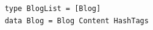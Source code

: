 \begin{lstlisting}
    type BlogList = [Blog]
    data Blog = Blog Content HashTags
\end{lstlisting}
